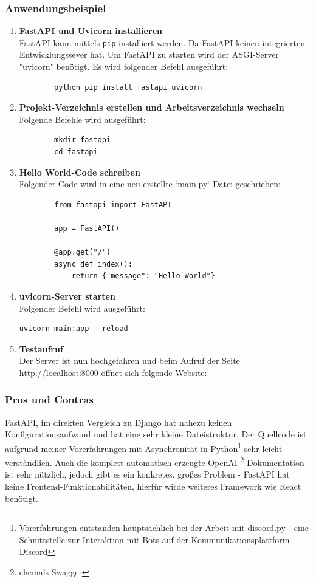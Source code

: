 \documentclass[letterpaper,11pt,leqno]{article}
\begin{document}
\subsubsection{Anwendungsbeispiel}
\begin{enumerate}
	\item\textbf{FastAPI und Uvicorn installieren}\\FastAPI kann mittels \verb|pip| installiert werden. Da FastAPI keinen
	integrierten Entwicklungssever hat. Um FastAPI zu starten wird der ASGI-Server "uvicorn" benötigt. Es wird folgender Befehl
	ausgeführt:
	\begin{verbatim}
		python pip install fastapi uvicorn
	\end{verbatim}
	\item\textbf{Projekt-Verzeichnis erstellen und Arbeitsverzeichnis wechseln}\\Folgende Befehle wird ausgeführt:
	\begin{verbatim}
		mkdir fastapi
		cd fastapi
	\end{verbatim}
	\item\textbf{Hello World-Code schreiben}\\Folgender Code wird in eine neu erstellte `main.py`-Datei geschrieben:
	\clearpage
	\begin{verbatim}
		from fastapi import FastAPI

		app = FastAPI()

		@app.get("/")
		async def index():
    		return {"message": "Hello World"}
	\end{verbatim}
	\item\textbf{uvicorn-Server starten}\\Folgender Befehl wird ausgeführt:
	\begin{verbatim}uvicorn main:app --reload\end{verbatim}
	\item\textbf{Testaufruf}\\Der Server ist nun hochgefahren und beim Aufruf der Seite \url{http://localhost:8000} öffnet sich
	folgende Website:
\end{enumerate}

\subsubsection{Pros und Contras}
FastAPI, im direkten Vergleich zu Django hat nahezu keinen Konfigurationsaufwand und hat eine sehr kleine Dateistruktur. Der
Quellcode ist aufgrund meiner Vorerfahrungen mit Asynchronität in Python\footnote{Vorerfahrungen entstanden hauptsächlich bei der
Arbeit mit discord.py - eine Schnittstelle zur Interaktion mit Bots auf der Kommunikationsplattform Discord} sehr leicht
verständlich. Auch die komplett automatisch erzeugte OpenAI \footnote{ehemals Swagger} Dokumentation ist sehr nützlich, jedoch gibt
es ein konkretes, großes Problem - FastAPI hat keine Frontend-Funktionabilitäten, hierfür wirde weiteres Framework wie React
benötigt.
\end{document}
